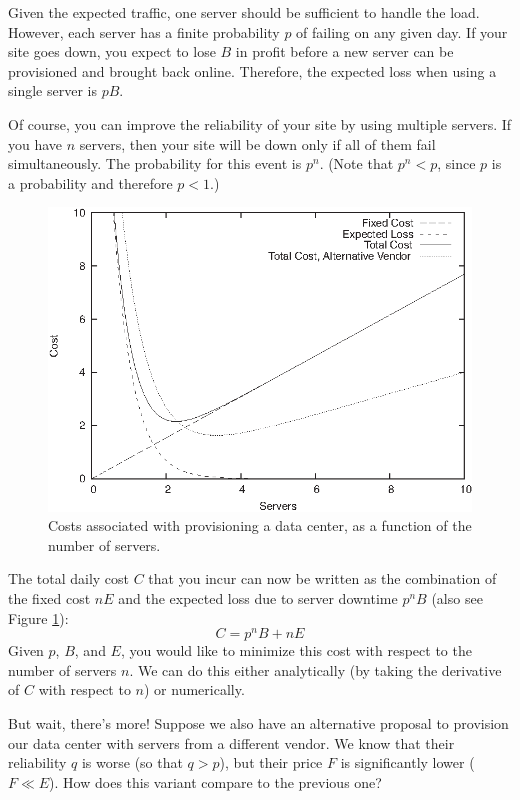 Given the expected traffic, one server should be sufficient to handle
the load.  However, each server has a finite probability $p$ of
failing on any given day. If your site goes down, you expect to lose
$B$ in profit before a new server can be provisioned and brought back
online.  Therefore, the expected loss when using a single server is $p
B$.

Of course, you can improve the reliability of your site by using
multiple servers.  If you have $n$ servers, then your site will be
down only if all of them fail simultaneously. The probability for this
event is $p^n$. (Note that $p^n < p$, since $p$ is a probability and
therefore $p < 1$.)

\begin{figure}
\centerline{\includegraphics{img/serverdowntime}}
  \caption{Costs associated with provisioning a data center, as a 
    function of the number of servers.}
  \label{fig:serverdowntime}
\end{figure}

The total daily cost $C$ that you incur can now be written as the
combination of the fixed cost $n E$ and the expected loss due to
server downtime $p^n B$ (also see Figure \ref{fig:serverdowntime}):
%
\[
C = p^n B + n E
\]
%
Given $p$, $B$, and $E$, you would like to minimize this cost with
respect to the number of servers $n$. We can do this either analytically
(by taking the derivative of $C$ with respect to $n$) or numerically.

But wait, there's more! Suppose we also have an alternative proposal to
provision our data center with servers from a different\vadjust{\pagebreak} vendor. We
know that their reliability $q$ is worse (so that $q > p$), but their
price $F$ is significantly lower ($F \ll E$). How does this variant
compare to the previous one?

